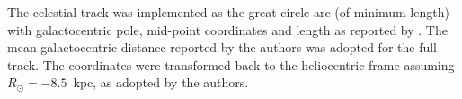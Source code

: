 The celestial track was implemented as the great circle arc (of minimum length) with galactocentric pole, mid-point coordinates and length as reported by \citet{Mateu2018}. The mean galactocentric distance reported by the authors was adopted for the full track. The coordinates were transformed back to the heliocentric frame assuming $R_\odot=-8.5$~kpc, as adopted by the authors.
